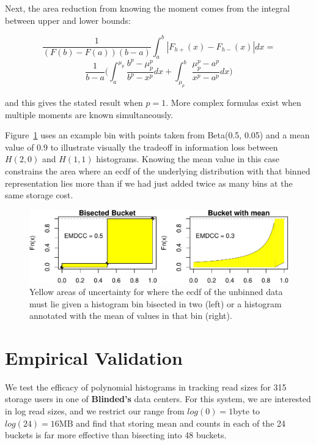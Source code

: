 \documentclass[preprint]{sig-alternate-per}
\begin{document}
Next, the area reduction from knowing the moment comes from the integral between upper and lower bounds:

$$
\frac{1}{(F(b)-F(a))(b-a)}\int_{a}^{b} |F_{h+}(x) - F_{h-}(x)|dx =
$$
$$
\frac{1}{b-a} \bigg(
\int_{a}^{\mu_p} \frac{b^p-\mu_p^p}{b^p-x^p}dx + \int_{\mu_p}^{b} \frac{\mu_p^p-a^p}{x^p-a^p}dx
\bigg)
$$

\noindent
and this gives the stated result when $p=1$.  More complex formulas exist when multiple moments are known simultaneously.

Figure~\ref{fig:polyemdcc} uses an example bin with points taken from
Beta(0.5, 0.05) and a mean value of 0.9 to illustrate visually the
tradeoff in information loss between $H(2,0)$ and $H(1,1)$ histograms.
Knowing the mean value in this case
constrains the area where an ecdf of the underlying distribution with
that binned representation lies more than if we had just added twice
as many bins at the same storage cost.

\begin{figure}[h!]
\centering
\includegraphics[width=\linewidth]{polyhistemdcc-crop.pdf}
\caption{Yellow areas of uncertainty for where the ecdf of the
  unbinned data must lie given a histogram bin bisected in two (left)
  or a histogram annotated with the mean of values in that bin (right).}
\label{fig:polyemdcc}
\end{figure}



\section{Empirical Validation}

We test the efficacy of polynomial histograms in tracking read sizes
for 315 storage users in one of
\textbf{Blinded's}
data centers.  For this
system, we are interested in log read sizes, and we restrict our range from $log(0) = 1 \text{byte}$ to $log(24) = 16\text{MB}$ and find that storing mean and counts in each of the 24 buckets is far more effective than bisecting into 48 buckets.
\end{document}
